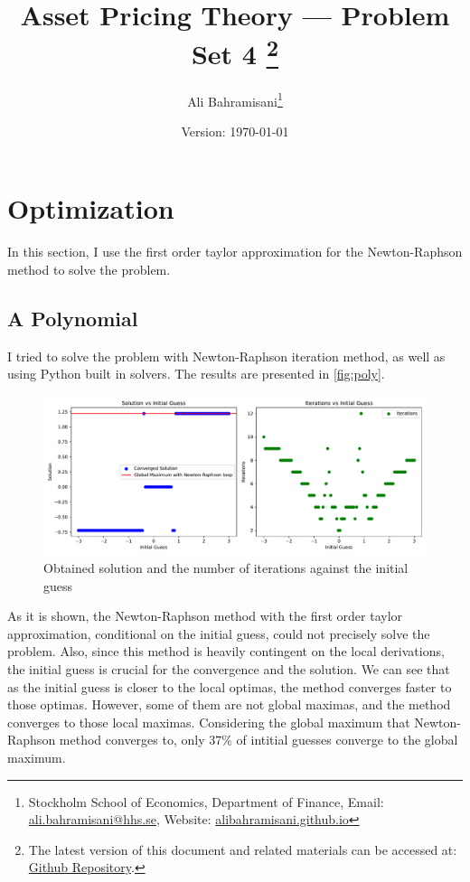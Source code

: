 \documentclass[a4paper,10pt,american]{article}
\title{Asset Pricing Theory --- Problem Set 4
\thanks{
    The latest version of this document and related 
    materials can be accessed at: 
    \href{https://github.com/AliBahramiSani/TAP_Opt_VaR}{Github Repository}.
}}
\author{Ali Bahramisani\thanks{Stockholm School
of Economics, Department of Finance, Email: 
\href{mailto:ali.bahramisani@hhs.se}{ali.bahramisani@hhs.se}, Website: \href{https://alibahramisani.github.io}{alibahramisani.github.io}}}
\date{Version: \today} %
\begin{document}
\maketitle
\thispagestyle{empty}



\newpage
{}

\section{Optimization}
In this section, I use the first order taylor approximation for the Newton-Raphson method to solve the problem.

\subsection{A Polynomial}
I tried to solve the problem with Newton-Raphson iteration method, as well as using Python built in solvers. The results are presented in \autoref{fig:poly}.

\begin{figure}[H]
\centering
\includegraphics[width=1\linewidth]{../Plots/NR_X0.pdf}
\caption{Obtained solution and the number of iterations against the initial guess}
\label{fig:poly}
\end{figure}

As it is shown, the Newton-Raphson method with the first order taylor approximation, conditional on the initial guess, could not precisely solve the problem. Also, since this method is heavily contingent on the local derivations, the initial guess is crucial for the convergence and the solution. We can see that as the initial guess is closer to the local optimas, the method converges faster to those optimas. However, some of them are not global maximas, and the method converges to those local maximas. Considering the global maximum that Newton-Raphson method converges to, only $37\%$ of intitial guesses converge to the global maximum. 
\end{document}
